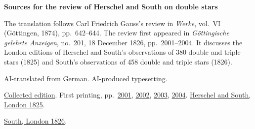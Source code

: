 \clearpage\thispagestyle{empty}
\begin{center}\Large\bfseries Sources for the review of Herschel and South on double stars\end{center}

The translation follows Carl Friedrich Gauss’s review in \emph{Werke}, vol.~VI (Göttingen, 1874), pp.~642--644. The review first appeared in \emph{Göttingische gelehrte Anzeigen}, no.~201, 18 December 1826, pp.~2001--2004. It discusses the London editions of Herschel and South’s observations of 380 double and triple stars (1825) and South’s observations of 458 double and triple stars (1826).

AI-translated from German. AI-produced typesetting.

\href{https://gdz.sub.uni-goettingen.de/id/PPN236007467}{Collected edition}. First printing, pp.~\href{https://images.p.sub.uni-goettingen.de/iiif/image/gdz:PPN385030444_1826_3:00000619/full/1650,/0/default.jpg}{2001}, \href{https://images.p.sub.uni-goettingen.de/iiif/image/gdz:PPN385030444_1826_3:00000620/full/1650,/0/default.jpg}{2002}, \href{https://images.p.sub.uni-goettingen.de/iiif/image/gdz:PPN385030444_1826_3:00000621/full/1650,/0/default.jpg}{2003}, \href{https://images.p.sub.uni-goettingen.de/iiif/image/gdz:PPN385030444_1826_3:00000622/full/1650,/0/default.jpg}{2004}. \href{https://www.huntington.org/collections/lib-751861}{Herschel and South, London 1825}.

\href{https://www.huntington.org/collections/lib-751860}{South, London 1826}.

\clearpage
